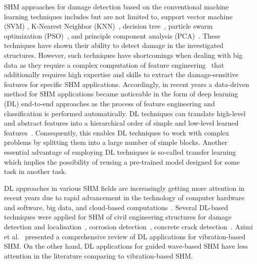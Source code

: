SHM approaches for damage detection based on the conventional machine learning techniques includes but are not limited to, support vector machine (SVM) \cite{noori2010application, Khoa2014, Ghiasi2016}, K-Nearest Neighbor (KNN)~\cite{Vitola2017}, decision tree~\cite{Mariniello2020}, particle swarm optimization (PSO)~\cite{Khatir2018, NouriShirazi2014}, and principle component analysis (PCA)~\cite{wang2014principal, nguyen2010fault, liu2014research}.
These techniques have shown their ability to detect damage in the investigated structures.
However, such techniques have shortcomings when dealing with big data as they require a complex computation of feature engineering~\cite{Gulgec2019} that additionally requires high expertise and skills to extract the damage-sensitive features for specific SHM applications.
Accordingly, in recent years a data-driven method for SHM applications became noticeable in the form of deep learning (DL) end-to-end approaches as the process of feature engineering and classification is performed automatically.
DL techniques can translate high-level and abstract features into a hierarchical order of simple and low-level learned features~\cite{Goodfellow-et-al-2016}.
Consequently, this enables DL techniques to work with complex problems by splitting them into a large number of simple blocks. 
Another essential advantage of employing DL techniques is so-called transfer learning which implies the possibility of reusing a pre-trained model designed for some task in another task.

DL approaches in various SHM fields are increasingly getting more attention in recent years due to rapid advancement in the technology of computer hardware and software, big data, and cloud-based computations~\cite{Azimi}.
Several DL-based techniques were applied for SHM of civil engineering structures for damage detection and localisation~\cite{Cha2018, Kong2018}, corrosion detection~\cite{Atha2018}, concrete crack detection~\cite{Dung2019}.
Azimi et al.~\cite{Azimi} presented a comprehensive review of DL applications for vibration-based SHM.
On the other hand, DL applications for guided wave-based SHM have less attention in the literature comparing to vibration-based SHM.

